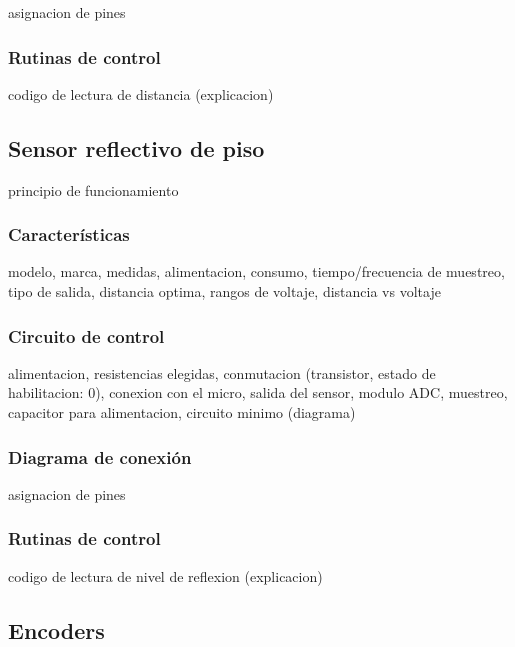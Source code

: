 asignacion de pines

\subsubsection{Rutinas de control}
\label{h_sensado_ultrasonido_rutinas}

codigo de lectura de distancia (explicacion)

\subsection{Sensor reflectivo de piso}
\label{h_sensado_piso}

principio de funcionamiento

\subsubsection{Caracter\'isticas}
\label{h_sensado_piso_caracteristicas}

modelo, marca, medidas, alimentacion, consumo, tiempo/frecuencia de muestreo, tipo de salida, distancia optima, rangos de voltaje, distancia vs voltaje

\subsubsection{Circuito de control}
\label{h_sensado_piso_circuito}

alimentacion, resistencias elegidas, conmutacion (transistor, estado de habilitacion: 0), conexion con el micro, salida del sensor, modulo ADC, muestreo, capacitor para alimentacion, circuito minimo (diagrama)

\subsubsection{Diagrama de conexi\'on}
\label{h_sensado_piso_diagrama}

asignacion de pines

\subsubsection{Rutinas de control}
\label{h_sensado_piso_rutinas}

codigo de lectura de nivel de reflexion (explicacion)

\subsection{Encoders}
\label{h_sensado_encoder}

